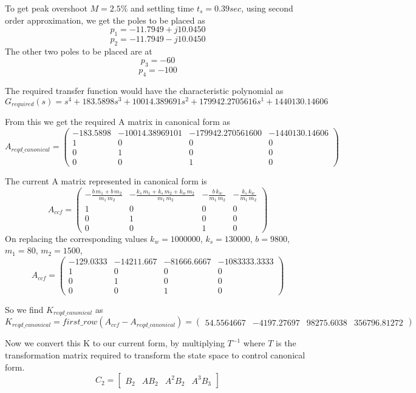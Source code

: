 \documentclass{article}
\newenvironment{answer}[2][Answer]{\begin{trivlist}
  \item[\hskip \labelsep {\bfseries #1}\hskip \labelsep {\bfseries #2:}]}{\end{trivlist}}
\begin{document}
\begin{answer}h
  To get peak overshoot $M=2.5\%$ and settling time $t_s = 0.39sec$, using second order approximation, we get the poles to be placed as
  $$p_1 = -11.7949 +j 10.0450$$
  $$p_2 = -11.7949 -j 10.0450$$
  The other two poles to be placed are at $$p_3 = -60$$ $$p_4 = -100$$

  The required transfer function would have the characteristic polynomial as
  $$G_{required}(s) = s^4 + 183.5898s^3 + 10014.389691s^2 + 179942.2705616s^1 + 1440130.14606$$

  From this we get the required A matrix in canonical form as
  $$A_{reqd\_canonical} = \left(\begin{array}{cccc} - 183.5898 & - 10014.38969101 & -179942.270561600 & -1440130.14606 \\ 1 & 0 & 0 & 0\\ 0 & 1 & 0 & 0\\ 0 & 0 & 1 & 0 \end{array}\right)$$

  The current A matrix represented in canonical form is
  $$A_{ccf} = \left(\begin{array}{cccc} -\frac{b\, m_{1} + b\, m_{2}}{m_{1}\, m_{2}} & -\frac{k_{s}\, m_{1} + k_{s}\, m_{2} + k_{w}\, m_{2}}{m_{1}\, m_{2}} & -\frac{b\, k_{w}}{m_{1}\, m_{2}} & -\frac{k_{s}\, k_{w}}{m_{1}\, m_{2}}\\ 1 & 0 & 0 & 0\\ 0 & 1 & 0 & 0\\ 0 & 0 & 1 & 0 \end{array}\right)$$
  On replacing the corresponding values $k_w = 1000000$, $k_s = 130000$, $b = 9800$, $m_1 = 80$, $m_2 = 1500$,
  $$A_{ccf} = \left(\begin{array}{cccc} -129.0333 & -14211.667 & -81666.6667 & -1083333.3333 \\ 1 & 0 & 0 & 0\\ 0 & 1 & 0 & 0\\ 0 & 0 & 1 & 0 \end{array}\right)$$

  So we find $K_{reqd\_canonical}$ as
  $$K_{reqd\_canonical} = first\_row(A_{ccf} - A_{reqd\_canonical}) = \left(\begin{array}{cccc} 54.5564667 & -4197.27697 & 98275.6038 & 356796.81272 \end{array}\right)$$

  Now we convert this K to our current form, by multiplying $T^{-1}$ where $T$ is the transformation matrix required to transform the state space to control canonical form.
  \[
    C_2 =
  \begin{bmatrix}
    B_2 & AB_2 & A^2B_2 &A^3B_3
  \end{bmatrix}
\]


\end{answer}
\end{document}
